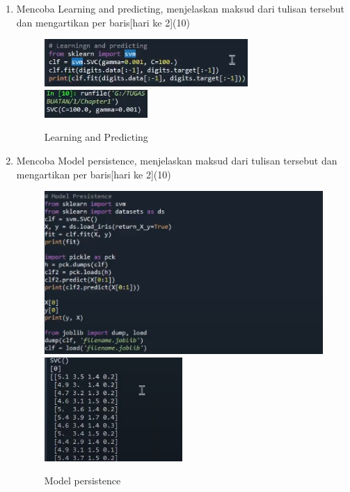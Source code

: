 \begin{enumerate}
\item
Mencoba Learning and predicting, menjelaskan maksud dari tulisan tersebut dan mengartikan per baris[hari ke 2](10)

\begin{figure}[ht]
    \centerline{\includegraphics[scale=1]{images/Chapter1/Chapter1d.png}
    \includegraphics[scale=1]{images/Chapter1/Chapter1da.png}}
    \caption{Learning and Predicting}
    \label{Learning and Predicting}
\end{figure}

\newpage
\item
Mencoba Model persistence, menjelaskan maksud dari tulisan tersebut dan mengartikan per baris[hari ke 2](10)

\begin{figure}[ht]
    \centerline{\includegraphics[scale=0.8]{images/Chapter1/Chapter1e.png}
    \includegraphics[scale=0.8]{images/Chapter1/Chapter1ea.png}}
    \caption{Model persistence}
    \label{Model persistence}
    \end{figure}


\end{enumerate}
